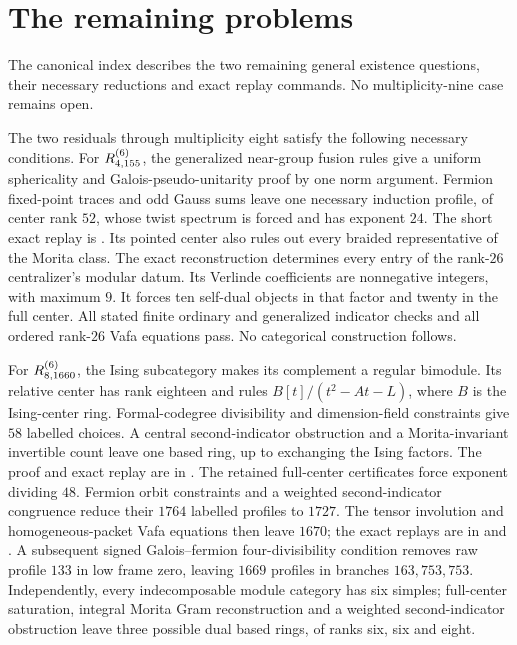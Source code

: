 \documentclass[11pt]{article}
\begin{document}
\section{The remaining problems}
The canonical index  describes the two
remaining general existence questions, their necessary reductions and
exact replay commands. No multiplicity-nine case remains open.

The two residuals through multiplicity eight satisfy the
following necessary conditions. For $R^{(6)}_{4,155}$, the generalized near-group fusion rules give a
uniform sphericality and Galois-pseudo-unitarity proof by one norm
argument.
Fermion fixed-point traces and odd Gauss sums leave one necessary
induction profile, of center rank $52$, whose twist spectrum is forced
and has exponent $24$. The short exact replay is
.
Its pointed center also rules out every braided representative of the
Morita class. The exact reconstruction determines every entry of the
rank-$26$ centralizer's modular datum. Its Verlinde coefficients are
nonnegative integers, with maximum $9$. It forces ten self-dual
objects in that factor and twenty in the full center. All stated finite
ordinary and generalized indicator checks and all ordered rank-$26$
Vafa equations pass. No categorical construction follows.

For $R^{(6)}_{8,1660}$, the Ising subcategory makes its complement a
regular bimodule. Its relative center has rank eighteen and rules
$B[t]/(t^2-At-L)$, where $B$ is the Ising-center ring.
Formal-codegree divisibility and dimension-field constraints give
$58$ labelled choices. A central second-indicator obstruction and a
Morita-invariant invertible count leave one based ring, up to exchanging
the Ising factors.
The proof and exact replay are in
.
The retained full-center certificates force exponent dividing $48$.
Fermion orbit constraints and a weighted second-indicator congruence
reduce their $1764$ labelled profiles to $1727$. The tensor involution and
homogeneous-packet Vafa equations then leave $1670$; the exact replays are in
 and
.
A subsequent signed Galois--fermion four-divisibility condition removes
raw profile $133$ in low frame zero, leaving $1669$ profiles in branches
$163,753,753$. Independently, every indecomposable module category has
six simples; full-center saturation, integral Morita Gram reconstruction
and a weighted second-indicator obstruction leave three possible dual
based rings, of ranks six, six and eight.
\end{document}
